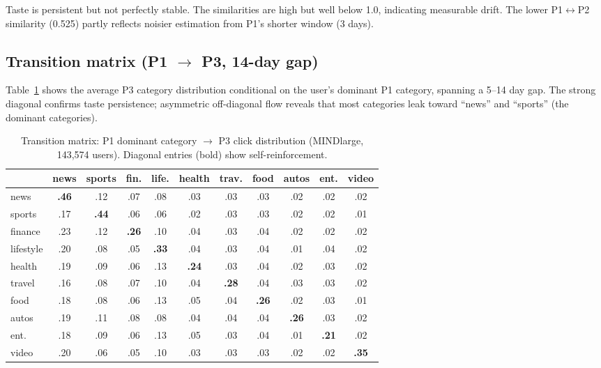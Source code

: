 \documentclass[11pt]{article}
\begin{document}
Taste is persistent but not perfectly stable. The similarities are high but well below 1.0, indicating measurable drift. The lower P1$\leftrightarrow$P2 similarity (0.525) partly reflects noisier estimation from P1's shorter window (3 days).

\subsection{Transition matrix (P1 $\to$ P3, 14-day gap)}

Table~\ref{tab:transition} shows the average P3 category distribution conditional on the user's dominant P1 category, spanning a 5--14 day gap. The strong diagonal confirms taste persistence; asymmetric off-diagonal flow reveals that most categories leak toward ``news'' and ``sports'' (the dominant categories).

\begin{table}[ht]
\centering
\caption{Transition matrix: P1 dominant category $\to$ P3 click distribution (MINDlarge, 143,574 users). Diagonal entries (bold) show self-reinforcement.}
\label{tab:transition}
\small
\setlength{\tabcolsep}{3.5pt}
\begin{tabular}{l|cccccccccc}
\toprule
& news & sports & fin. & life. & health & trav. & food & autos & ent. & video \\
\midrule
news & \textbf{.46} & .12 & .07 & .08 & .03 & .03 & .03 & .02 & .02 & .02 \\
sports & .17 & \textbf{.44} & .06 & .06 & .02 & .03 & .03 & .02 & .02 & .01 \\
finance & .23 & .12 & \textbf{.26} & .10 & .04 & .03 & .04 & .02 & .02 & .02 \\
lifestyle & .20 & .08 & .05 & \textbf{.33} & .04 & .03 & .04 & .01 & .04 & .02 \\
health & .19 & .09 & .06 & .13 & \textbf{.24} & .03 & .04 & .02 & .03 & .02 \\
travel & .16 & .08 & .07 & .10 & .04 & \textbf{.28} & .04 & .03 & .03 & .02 \\
food & .18 & .08 & .06 & .13 & .05 & .04 & \textbf{.26} & .02 & .03 & .01 \\
autos & .19 & .11 & .08 & .08 & .04 & .04 & .04 & \textbf{.26} & .03 & .02 \\
ent. & .18 & .09 & .06 & .13 & .05 & .03 & .04 & .01 & \textbf{.21} & .02 \\
video & .20 & .06 & .05 & .10 & .03 & .03 & .03 & .02 & .02 & \textbf{.35} \\
\bottomrule
\end{tabular}
\end{table}
\end{document}
